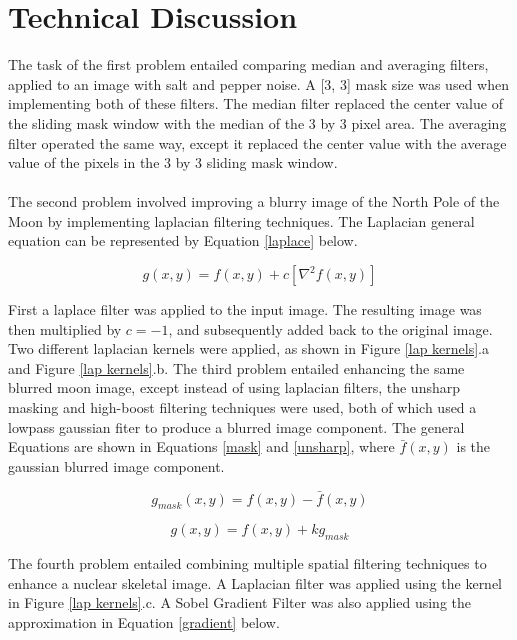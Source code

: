 \documentclass[./rarnold_report3.tex]{subfiles}
\begin{document}
\clearpage

\section*{Technical Discussion}

\noindent The task of the first problem entailed comparing median and averaging filters, applied to an image with salt and pepper noise.  A [3, 3] mask size was used when implementing both of these filters.  The median filter replaced the center value of the sliding mask window with the median of the 3 by 3 pixel area. The averaging filter operated the same way, except it replaced the center value with the average value of the pixels in the 3 by 3 sliding mask window.
\\ \\
\noindent The second problem involved improving a blurry image of the North Pole of the Moon by implementing laplacian filtering techniques.  The Laplacian general equation can be represented by Equation \eqref{laplace} below.  

\begin{equation}
\label{laplace}
g(x,y) = f(x,y) +c\left[\nabla^{2}f(x,y)  \right]
\end{equation}

\noindent First a laplace filter was applied to the input image.  The resulting image was then multiplied by $c=-1$, and subsequently added back to the original image.  Two different laplacian kernels were applied, as shown in Figure \ref{lap kernels}.a and Figure \ref{lap kernels}.b. The third problem entailed enhancing the same blurred moon image, except instead of using laplacian filters, the unsharp masking and high-boost filtering techniques were used, both of which used a lowpass gaussian fiter to produce a blurred image component.  The general Equations are shown in Equations \eqref{mask} and \eqref{unsharp}, where $\bar{f}(x,y)$ is the gaussian blurred image component.  

\begin{equation}
\label{mask}
g_{mask}(x,y) = f(x,y) - \bar{f}(x,y)
\end{equation}

\begin{equation}
\label{unsharp}
g(x,y) = f(x,y) + kg_{mask}
\end{equation}

\noindent The fourth problem entailed combining multiple spatial filtering techniques to enhance a nuclear skeletal image. A Laplacian filter was applied using the kernel in Figure \ref{lap kernels}.c.  A Sobel Gradient Filter was also applied using the approximation in Equation \eqref{gradient} below.
\end{document}
